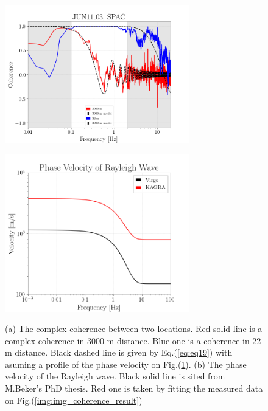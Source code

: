 \documentclass[a4paper,12pt]{book}
\begin{document}
\begin{figure}[H] 
 \begin{minipage}{0.5\hsize}
  \begin{center}
    \includegraphics[width=8.0cm]{./img_coherence_result.png}    
  \end{center}
  \subcaption{}  
  \label{img:img_coherence_result}
 \end{minipage}
 \begin{minipage}{0.5\hsize}
  \begin{center}
    \includegraphics[width=8.0cm]{./img_RwaveVelocity.png}    
  \end{center}
  \subcaption{}
  \label{img:img_RwaveVelocity}  
 \end{minipage}
  \caption{(a) The complex coherence between two locations. Red solid line is a complex coherence in 3000 m distance. Blue one is a coherence in 22 m distance. Black dashed line is given by Eq.(\ref{eq:eq19}) with asuming a profile of the phase velocity on Fig.(\ref{img:img_RwaveVelocity}). (b) The phase velocity of the Rayleigh wave. Black solid line is sited from M.Beker's PhD thesis. Red one is taken by fitting the measured data on Fig.(\ref{img:img_coherence_result})} 
\end{figure}

\subsubsection{}
\end{document}
